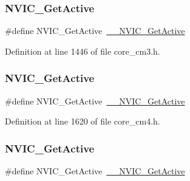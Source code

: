 \subsubsection{\texorpdfstring{N\+V\+I\+C\+\_\+\+Get\+Active}{NVIC\_GetActive}\hspace{0.1cm}{\footnotesize\ttfamily [4/9]}}
{\footnotesize\ttfamily \#define N\+V\+I\+C\+\_\+\+Get\+Active~\hyperlink{group___c_m_s_i_s___core___n_v_i_c_functions_gaa2837003c28c45abf193fe5e8d27f593}{\+\_\+\+\_\+\+N\+V\+I\+C\+\_\+\+Get\+Active}}



Definition at line 1446 of file core\+\_\+cm3.\+h.

\mbox{\label{group___c_m_s_i_s___core___n_v_i_c_functions_ga58ad3f352f832235ab3b192ff4745320}} 
\subsubsection{\texorpdfstring{N\+V\+I\+C\+\_\+\+Get\+Active}{NVIC\_GetActive}\hspace{0.1cm}{\footnotesize\ttfamily [5/9]}}
{\footnotesize\ttfamily \#define N\+V\+I\+C\+\_\+\+Get\+Active~\hyperlink{group___c_m_s_i_s___core___n_v_i_c_functions_gaa2837003c28c45abf193fe5e8d27f593}{\+\_\+\+\_\+\+N\+V\+I\+C\+\_\+\+Get\+Active}}



Definition at line 1620 of file core\+\_\+cm4.\+h.

\mbox{\label{group___c_m_s_i_s___core___n_v_i_c_functions_ga58ad3f352f832235ab3b192ff4745320}} 
\subsubsection{\texorpdfstring{N\+V\+I\+C\+\_\+\+Get\+Active}{NVIC\_GetActive}\hspace{0.1cm}{\footnotesize\ttfamily [6/9]}}
{\footnotesize\ttfamily \#define N\+V\+I\+C\+\_\+\+Get\+Active~\hyperlink{group___c_m_s_i_s___core___n_v_i_c_functions_gaa2837003c28c45abf193fe5e8d27f593}{\+\_\+\+\_\+\+N\+V\+I\+C\+\_\+\+Get\+Active}}



